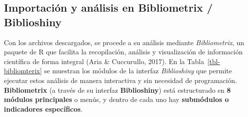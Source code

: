 \documentclass[
  spanish,
  letterpaper,
  DIV=11,
  numbers=noendperiod]{scrreprt}
\begin{document}
\subsection{Importación y análisis en Bibliometrix /
Biblioshiny}\label{importaciuxf3n-y-anuxe1lisis-en-bibliometrix-biblioshiny}

Con los archivos descargados, se procede a su análisis mediante
\emph{Bibliometrix}, un paquete de R que facilita la recopilación,
análisis y visualización de información científica de forma integral
(Aria \& Cuccurullo, 2017). En la Tabla~\ref{tbl-bibliomterix} se
muestran los módulos de la interfaz \emph{Biblioshiny} que permite
ejecutar estos análisis de manera interactiva y sin necesidad de
programación. \textbf{Bibliometrix} (a través de su interfaz
\textbf{Biblioshiny}) está estructurado en \textbf{8 módulos
principales} o menús, y dentro de cada uno hay \textbf{submódulos o
indicadores específicos}.
\end{document}
